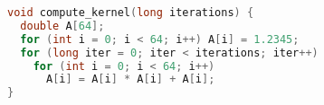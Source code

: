 \begin{lstlisting}[language=C,caption={Core API implementation of compute kernel.},label={lst:compute-kernel},style=codeblock,float]
void compute_kernel(long iterations) {
  double A[64];
  for (int i = 0; i < 64; i++) A[i] = 1.2345;
  for (long iter = 0; iter < iterations; iter++)
    for (int i = 0; i < 64; i++)
      A[i] = A[i] * A[i] + A[i];
}
\end{lstlisting}
